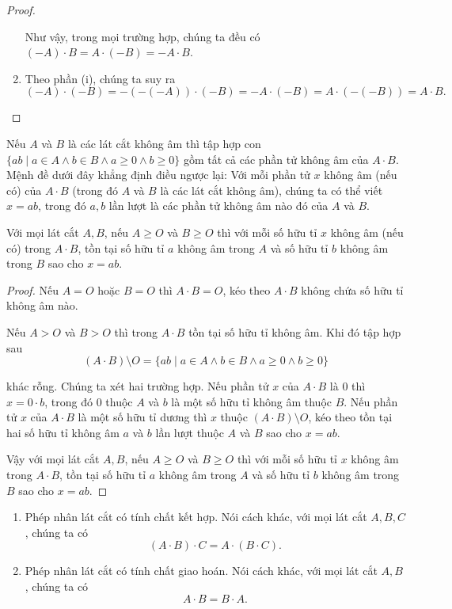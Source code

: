 \begin{proof}
\begin{enumerate}[label={(\roman*)}]
              Như vậy, trong mọi trường hợp, chúng ta đều có $(-A)\cdot B = A\cdot (-B) = -A\cdot B$.
        \item Theo phần (i), chúng ta suy ra
              \[
                  (-A)\cdot (-B) = -(-(-A))\cdot (-B) = -A\cdot (-B) = A\cdot (-(-B)) = A\cdot B.
              \]
    \end{enumerate}
\end{proof}

Nếu $A$ và $B$ là các lát cắt không âm thì tập hợp con $\{ ab \mid a\in A\wedge b\in B\wedge a\geq 0\wedge b\geq 0 \}$ gồm tất cả các phần tử không âm của $A\cdot B$. Mệnh đề dưới đây khẳng định điều ngược lại: Với mỗi phần tử $x$ không âm (nếu có) của $A\cdot B$ (trong đó $A$ và $B$ là các lát cắt không âm), chúng ta có thể viết $x = ab$, trong đó $a, b$ lần lượt là các phần tử không âm nào đó của $A$ và $B$.

\begin{proposition}\label{proposition:nonnegative-elements-of-dedekind-cuts-multiplication}
    Với mọi lát cắt $A, B$, nếu $A\geq O$ và $B\geq O$ thì với mỗi số hữu tỉ $x$ không âm (nếu có) trong $A\cdot B$, tồn tại số hữu tỉ $a$ không âm trong $A$ và số hữu tỉ $b$ không âm trong $B$ sao cho $x = ab$.
\end{proposition}

\begin{proof}
    Nếu $A = O$ hoặc $B = O$ thì $A\cdot B = O$, kéo theo $A\cdot B$ không chứa số hữu tỉ không âm nào.

    Nếu $A > O$ và $B > O$ thì trong $A\cdot B$ tồn tại số hữu tỉ không âm. Khi đó tập hợp sau
    \[
        (A\cdot B) \setminus O = \{ ab \mid a\in A \wedge b\in B \wedge a\geq 0 \wedge b\geq 0 \}
    \]

    khác rỗng. Chúng ta xét hai trường hợp. Nếu phần tử $x$ của $A\cdot B$ là $0$ thì $x = 0\cdot b$, trong đó $0$ thuộc $A$ và $b$ là một số hữu tỉ không âm thuộc $B$. Nếu phần tử $x$ của $A\cdot B$ là một số hữu tỉ dương thì $x$ thuộc $(A\cdot B)\setminus O$, kéo theo tồn tại hai số hữu tỉ không âm $a$ và $b$ lần lượt thuộc $A$ và $B$ sao cho $x = ab$.

    Vậy với mọi lát cắt $A, B$, nếu $A\geq O$ và $B\geq O$ thì với mỗi số hữu tỉ $x$ không âm trong $A\cdot B$, tồn tại số hữu tỉ $a$ không âm trong $A$ và số hữu tỉ $b$ không âm trong $B$ sao cho $x = ab$.
\end{proof}

\begin{theorem}
    \begin{enumerate}[label={(\roman*)}]
        \item Phép nhân lát cắt có tính chất kết hợp. Nói cách khác, với mọi lát cắt $A, B, C$, chúng ta có
              \[
                  (A\cdot B)\cdot C = A\cdot (B\cdot C).
              \]
        \item Phép nhân lát cắt có tính chất giao hoán. Nói cách khác, với mọi lát cắt $A, B$, chúng ta có
              \[
                  A\cdot B = B\cdot A.
              \]
    \end{enumerate}
\end{theorem}

